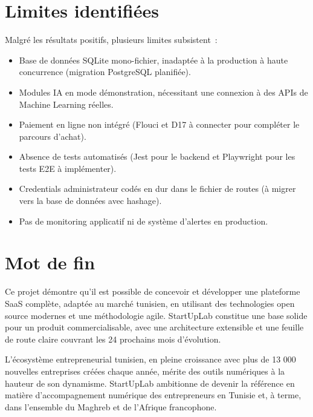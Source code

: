 \section*{Limites identifiées}

Malgré les résultats positifs, plusieurs limites subsistent~:

\begin{itemize}
    \item Base de données SQLite mono-fichier, inadaptée à la production à haute concurrence (migration PostgreSQL planifiée).
    \item Modules IA en mode démonstration, nécessitant une connexion à des APIs de Machine Learning réelles.
    \item Paiement en ligne non intégré (Flouci et D17 à connecter pour compléter le parcours d'achat).
    \item Absence de tests automatisés (Jest pour le backend et Playwright pour les tests E2E à implémenter).
    \item Credentials administrateur codés en dur dans le fichier de routes (à migrer vers la base de données avec hashage).
    \item Pas de monitoring applicatif ni de système d'alertes en production.
\end{itemize}

\section*{Mot de fin}

Ce projet démontre qu'il est possible de concevoir et développer une plateforme SaaS complète, adaptée au marché tunisien, en utilisant des technologies open source modernes et une méthodologie agile. StartUpLab constitue une base solide pour un produit commercialisable, avec une architecture extensible et une feuille de route claire couvrant les 24 prochains mois d'évolution.

L'écosystème entrepreneurial tunisien, en pleine croissance avec plus de 13 000 nouvelles entreprises créées chaque année, mérite des outils numériques à la hauteur de son dynamisme. StartUpLab ambitionne de devenir la référence en matière d'accompagnement numérique des entrepreneurs en Tunisie et, à terme, dans l'ensemble du Maghreb et de l'Afrique francophone.
